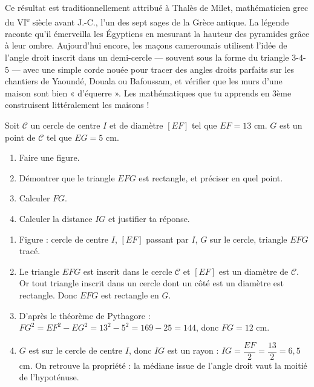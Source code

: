 \documentclass[11pt]{article}
\newcommand{\cle}[1]{{\popxbold\color{popdark}#1}}
\begin{document}
\begin{savaistu}
Ce résultat est traditionnellement attribué à \cle{Thalès de Milet}, mathématicien grec du VI\textsuperscript{e} siècle avant J.-C., l'un des sept sages de la Grèce antique. La légende raconte qu'il émerveilla les Égyptiens en mesurant la hauteur des pyramides grâce à leur ombre. Aujourd'hui encore, les maçons camerounais utilisent l'idée de l'angle droit inscrit dans un demi-cercle — souvent sous la forme du triangle $3$-$4$-$5$ — avec une simple corde nouée pour tracer des angles droits parfaits sur les chantiers de Yaoundé, Douala ou Bafoussam, et vérifier que les murs d'une maison sont bien « d'équerre ». Les mathématiques que tu apprends en 3ème construisent littéralement les maisons !
\end{savaistu}

\begin{exercice}
Soit $\mathcal{C}$ un cercle de centre $I$ et de diamètre $[EF]$ tel que $EF = 13$ cm. $G$ est un point de $\mathcal{C}$ tel que $EG = 5$ cm.
\begin{enumerate}
  \item Faire une figure.
  \item Démontrer que le triangle $EFG$ est rectangle, et préciser en quel point.
  \item Calculer $FG$.
  \item Calculer la distance $IG$ et justifier ta réponse.
\end{enumerate}
\end{exercice}

\begin{corrige}
\begin{enumerate}
  \item Figure : cercle de centre $I$, $[EF]$ passant par $I$, $G$ sur le cercle, triangle $EFG$ tracé.
  \item Le triangle $EFG$ est inscrit dans le cercle $\mathcal{C}$ et $[EF]$ est un diamètre de $\mathcal{C}$. Or tout triangle inscrit dans un cercle dont un côté est un diamètre est rectangle. Donc $EFG$ est rectangle en $G$.
  \item D'après le théorème de Pythagore : $FG^2 = EF^2 - EG^2 = 13^2 - 5^2 = 169 - 25 = 144$, donc $FG = 12$ cm.
  \item $G$ est sur le cercle de centre $I$, donc $IG$ est un rayon : $IG = \dfrac{EF}{2} = \dfrac{13}{2} = 6{,}5$ cm. On retrouve la propriété : la médiane issue de l'angle droit vaut la moitié de l'hypoténuse.
\end{enumerate}
\end{corrige}
\end{document}
